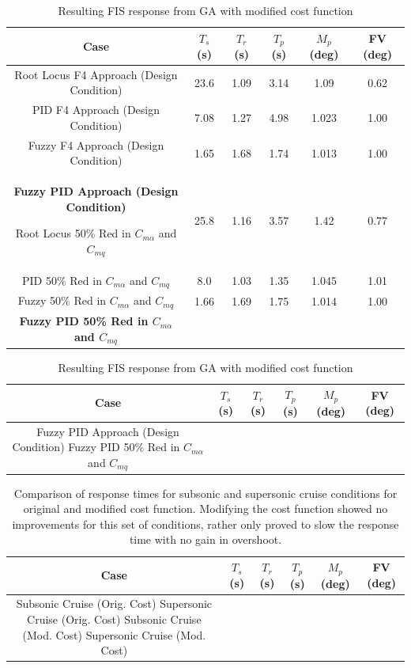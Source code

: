 \begin{table}
    \centering
    \caption{Comparison table of current results with those of Bossert and Cohen}\label{t:f4}
    \begin{tabular}{|c|c|c|c|c|c|}\hline
        Case
            & $T_s$ (s) & $T_r$ (s) & $T_p$ (s) & $M_p$ (deg) & FV (deg) \\\hline
        Root Locus F4 Approach (Design Condition)
            & 23.6      & 1.09      & 3.14      & 1.09        & 0.62 \\\hline
        PID F4 Approach (Design Condition)
            & 7.08      & 1.27      & 4.98      & 1.023       & 1.00 \\\hline
        Fuzzy F4 Approach (Design Condition)
            & 1.65      & 1.68      & 1.74      & 1.013       & 1.00 \\\hline
        \textbf{Fuzzy PID Approach (Design Condition)}
            
        Root Locus 50\% Red in $C_{m\alpha}$ and $C_{mq}$
            & 25.8      & 1.16      & 3.57      & 1.42        & 0.77 \\\hline
        PID 50\% Red in $C_{m\alpha}$ and $C_{mq}$
            & 8.0       & 1.03      & 1.35      & 1.045       & 1.01 \\\hline
        Fuzzy 50\% Red in $C_{m\alpha}$ and $C_{mq}$
            & 1.66      & 1.69      & 1.75      & 1.014       & 1.00 \\\hline
        \textbf{Fuzzy PID 50\% Red in $C_{m\alpha}$ and $C_{mq}$}
            
    \end{tabular}
    \bigskip
    \bigskip
    \bigskip
    \caption{Resulting FIS response from GA with modified cost function}\label{t:f4_nos}
    \begin{tabular}{|c|c|c|c|c|c|}\hline
        Case & $T_s$ (s) & $T_r$ (s) & $T_p$ (s) & $M_p$ (deg) & FV (deg) \\\hline
        Fuzzy PID Approach (Design Condition) 
        Fuzzy PID 50\% Red in $C_{m\alpha}$ and $C_{mq}$ 
    \end{tabular}
\end{table}

\begin{table}[ht]
    \centering
    \caption{Comparison of response times for subsonic and supersonic cruise conditions for original and
             modified cost function. Modifying the cost function showed no improvements for this set of
             conditions, rather only proved to slow the response time with no gain in overshoot.}%
             \label{t:subsup}
    \begin{tabular}{|c|c|c|c|c|c|}\hline
        Case & $T_s$ (s) & $T_r$ (s) & $T_p$ (s) &
        $M_p$ (deg) & FV (deg) \\\hline Subsonic Cruise (Orig. Cost)  Supersonic Cruise (Orig.
        Cost)  Subsonic Cruise (Mod. Cost)  Supersonic Cruise (Mod.
        Cost) 
    \end{tabular}
\end{table}


